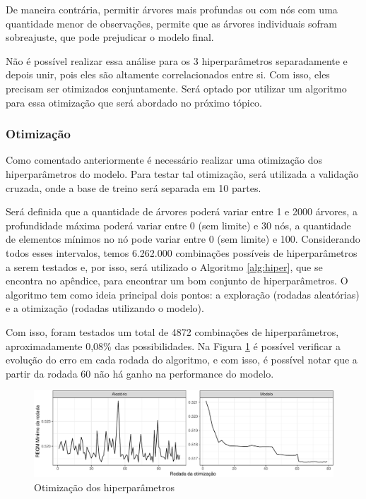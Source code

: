 \documentclass[
	12pt,				%
	a4paper,		%
	oneside,    %
	chapter=TITLE,		   %
	section=TITLE,		   %
	subsection=TITLE,	   %
	subsubsection=TITLE, %
	english,			%
	french,				%
	spanish,			%
	brazil,				%
]{abntex2}
\begin{document}
De maneira contrária, permitir árvores mais profundas ou com nós com uma
quantidade menor de observações, permite que as árvores individuais
sofram sobreajuste, que pode prejudicar o modelo final.

Não é possível realizar essa análise para os 3 hiperparâmetros
separadamente e depois unir, pois eles são altamente correlacionados
entre si. Com isso, eles precisam ser otimizados conjuntamente. Será
optado por utilizar um algoritmo para essa otimização que será abordado
no próximo tópico.

\hypertarget{otimizauxe7uxe3o}{%
\subsubsection{Otimização}\label{otimizauxe7uxe3o}}

Como comentado anteriormente é necessário realizar uma otimização dos
hiperparâmetros do modelo. Para testar tal otimização, será utilizada a
validação cruzada, onde a base de treino será separada em 10 partes.

Será definida que a quantidade de árvores poderá variar entre 1 e 2000
árvores, a profundidade máxima poderá variar entre 0 (sem limite) e 30
nós, a quantidade de elementos mínimos no nó pode variar entre 0 (sem
limite) e 100. Considerando todos esses intervalos, temos 6.262.000
combinações possíveis de hiperparâmetros a serem testados e, por isso,
será utilizado o Algoritmo \ref{alg:hiper}, que se encontra no apêndice,
para encontrar um bom conjunto de hiperparâmetros. O algoritmo tem como
ideia principal dois pontos: a exploração (rodadas aleatórias) e a
otimização (rodadas utilizando o modelo).

Com isso, foram testados um total de 4872 combinações de
hiperparâmetros, aproximadamente 0,08\% das possibilidades. Na Figura
\ref{otimizacao} é possível verificar a evolução do erro em cada rodada
do algoritmo, e com isso, é possível notar que a partir da rodada 60 não
há ganho na performance do modelo.

\begin{figure}
\centering
\includegraphics{00-TCC_files/figure-latex/otimizacao-1.pdf}
\caption{\label{otimizacao}Otimização dos hiperparâmetros}
\end{figure}
\end{document}
